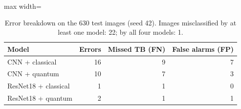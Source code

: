 \begin{table}[htbp]
\centering
\small
\caption{Error breakdown on the 630 test images (seed 42). Images misclassified by at least one model: 22; by all four models: 1.}
\label{tab:comparison_errors}
\begin{adjustbox}{max width=\linewidth}
\begin{tabular}{lrrr}
\toprule
Model & Errors & Missed TB (FN) & False alarms (FP) \\
\midrule
CNN + classical & 16 & 9 & 7 \\
CNN + quantum & 10 & 7 & 3 \\
ResNet18 + classical & 1 & 1 & 0 \\
ResNet18 + quantum & 2 & 1 & 1 \\
\bottomrule
\end{tabular}
\end{adjustbox}
\end{table}
